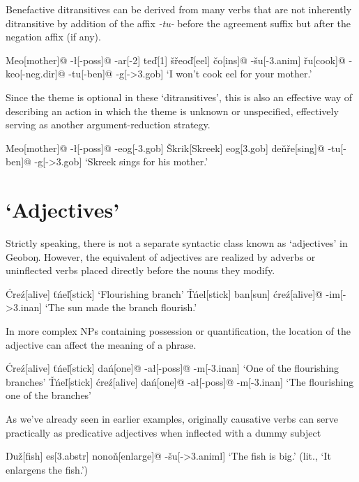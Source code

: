 \documentclass[a4paper,11pt,oneside,openany]{memoir}
\newcommand{\vt}{ť}
\newcommand{\vd}{ď}
\newcommand{\vc}{č}
\newcommand{\vz}{ž}
\newcommand{\vs}{š}
\newcommand{\vr}{ř}
\newcommand{\vl}{ľ}
\newcommand{\vn}{ň}
\newcommand{\vT}{Ť}
\newcommand{\vS}{Š}
\newcommand{\Engma}{Ŋ}
\newcommand{\engma}{ŋ}
\begin{document}
Benefactive ditransitives can be derived from many verbs that are not inherently ditransitive by addition of the affix \textit{-tu-} before the agreement suffix but after the negation affix (if any).

\ex
\begingl
Meo[mother]@
-\l[\sc -poss]@
-ar[-2]
te{\vd}[1]
\vs\vr eo{\vd}[eel]
\vc o[\sc ins]@
-\vs u[\sc -3.anim] 
\vr u[cook]@
-keo[-{\sc neg.dir}]@
-tu[-{\sc ben}]@
-g[-{\sc >3.gob}]
\glft `I won't cook eel for your mother.'
\endgl
\xe

Since the theme is optional in these `ditransitives', this is also an effective way of describing an action in which the theme is unknown or unspecified, effectively serving as another argument-reduction strategy.

\ex
\begingl
Meo[mother]@
-\l[\sc -poss]@
-eog[\sc -3.gob]
\vS krik[Skreek]
eog[\sc 3.gob]
de\vn\vr e[sing]@
-tu[\sc -ben]@
-g[\sc ->3.gob]
\glft `Skreek sings for his mother.'
\endgl
\xe

\section{`Adjectives'}

Strictly speaking, there is not a separate syntactic class known as `adjectives' in Geobo{\engma}. However, the equivalent of adjectives are realized by adverbs or uninflected verbs placed directly before the nouns they modify.

\pex
\a
\begingl
\'Cre\'z[alive]
\vt\'ne\vl[stick]
\glft  `Flourishing branch'
\endgl
\a 
\begingl
\vT\'nel[stick]
ban[sun]
\'cre\'z[alive]@
-im[\sc ->3.inan]
\glft `The sun made the branch flourish.'
\endgl
\xe

In more complex NPs containing possession or quantification, the location of the adjective can affect the meaning of a phrase.

\pex
\a
\begingl
\'Cre\'z[alive]
\vt\'ne{\vl}[stick]
da\'n[one]@
-a\l[-{\sc poss}]@
-m[-{\sc 3.inan}]
\glft  `One of the flourishing branches'
\endgl
\a
\begingl
\vT\'ne{\vl}[stick]
\'cre\'z[alive]
da\'n[one]@
-a\l[-{\sc poss}]@
-m[-{\sc 3.inan}]
\glft  `The flourishing one of the branches'
\endgl
\xe

As we've already seen in earlier examples, originally causative verbs can serve practically as predicative adjectives when inflected with a dummy subject

\ex
\begingl
\Engma u\vz[fish]
es[\sc 3.abstr]
nono\vn[enlarge]@
-\vs u[\sc ->3.animl]
\glft `The fish is big.' (lit., `It enlargens the fish.')
\endgl
\xe
\end{document}
